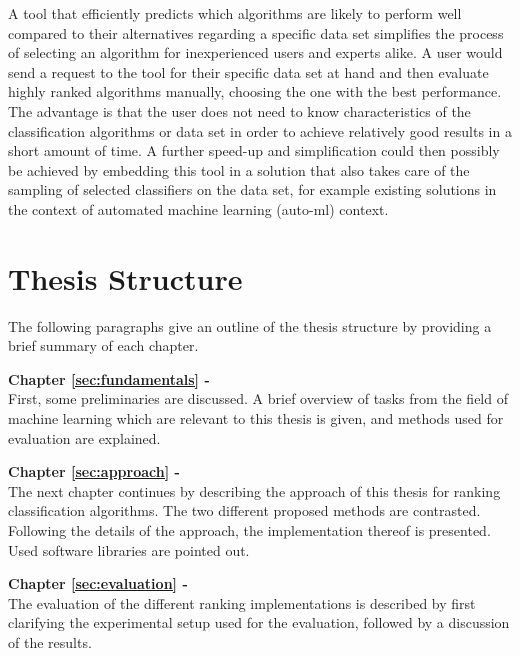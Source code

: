 A tool that efficiently predicts which algorithms are likely to perform well compared to their alternatives regarding a specific data set simplifies the process of selecting an algorithm for inexperienced users and experts alike. A user would send a request to the tool for their specific data set at hand and then evaluate highly ranked algorithms manually, choosing the one with the best performance. The advantage is that the user does not need to know characteristics of the classification algorithms or data set in order to achieve relatively good results in a short amount of time. A further speed-up and simplification could then possibly be achieved by embedding this tool in a solution that also takes care of the sampling of selected classifiers on the data set, for example existing solutions in the context of automated machine learning (auto-ml) context.

\section{Thesis Structure}
\label{sec:intro:structure}
The following paragraphs give an outline of the thesis structure by providing a brief summary of each chapter.

\textbf{Chapter \ref{sec:fundamentals} - } \\[0.2em]
First, some preliminaries are discussed. A brief overview of tasks from the field of machine learning which are relevant to this thesis is given, and methods used for evaluation are explained. 

\textbf{Chapter \ref{sec:approach} - } \\[0.2em]
The next chapter continues by describing the approach of this thesis for ranking classification algorithms. The two different proposed methods are contrasted. Following the details of the approach, the implementation thereof is presented. Used software libraries are pointed out.

\textbf{Chapter \ref{sec:evaluation} - } \\[0.2em]
The evaluation of the different ranking implementations is described by first clarifying the experimental setup used for the evaluation, followed by a discussion of the results.

